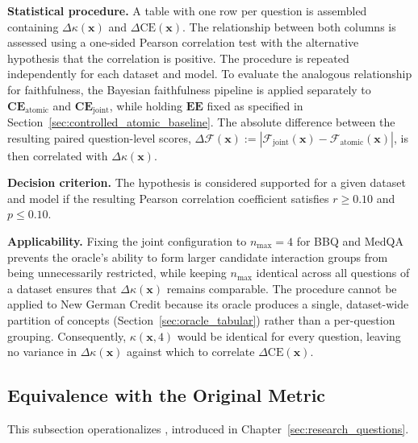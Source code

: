 \noindent\textbf{Statistical procedure.} A table with one row per question is assembled containing $\Delta\kappa(\mathbf{x})$ and $\Delta \mathrm{CE}(\mathbf{x})$. The relationship between both columns is assessed using a one-sided Pearson correlation test with the alternative hypothesis that the correlation is positive. The procedure is repeated independently for each dataset and model. To evaluate the analogous relationship for faithfulness, the Bayesian faithfulness pipeline is applied separately to $\mathbf{CE}_{\mathrm{atomic}}$ and $\mathbf{CE}_{\mathrm{joint}}$, while holding $\mathbf{EE}$ fixed as specified in Section~\ref{sec:controlled_atomic_baseline}. The absolute difference between the resulting paired question-level scores, $\Delta\mathcal{F}(\mathbf{x}):=|\mathcal{F}_{\mathrm{joint}}(\mathbf{x})-\mathcal{F}_{\mathrm{atomic}}(\mathbf{x})|$, is then correlated with $\Delta\kappa(\mathbf{x})$.

\noindent\textbf{Decision criterion.} The hypothesis is considered supported for a given dataset and model if the resulting Pearson correlation coefficient satisfies $r \ge 0.10$ and $p \le 0.10$.

\noindent\textbf{Applicability.} Fixing the joint configuration to $n_{\max}=4$ for BBQ and MedQA prevents the oracle's ability to form larger candidate interaction groups from being unnecessarily restricted, while keeping $n_{\max}$ identical across all questions of a dataset ensures that $\Delta\kappa(\mathbf{x})$ remains comparable. The procedure cannot be applied to New German Credit because its oracle produces a single, dataset-wide partition of concepts (Section~\ref{sec:oracle_tabular}) rather than a per-question grouping. Consequently, $\kappa(\mathbf{x},4)$ would be identical for every question, leaving no variance in $\Delta\kappa(\mathbf{x})$ against which to correlate $\Delta \mathrm{CE}(\mathbf{x})$.

\subsection{Equivalence with the Original Metric}
This subsection operationalizes , introduced in Chapter~\ref{sec:research_questions}.

